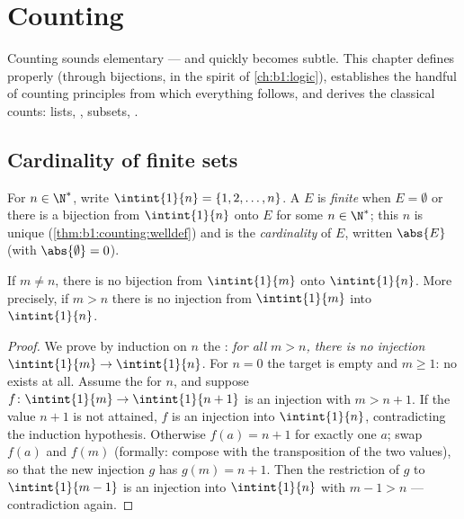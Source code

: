 \chapter{Counting}\label{ch:b1:counting}

Counting  sounds elementary --- and quickly becomes subtle.
This chapter defines  properly (through bijections, in the
spirit of \cref{ch:b1:logic}), establishes the handful of counting
principles from which everything follows, and derives the classical
counts: lists, , subsets, .

\section{Cardinality of finite sets}

\begin{definition}\label{def:b1:counting:card}
For $n \in \N^*$, write $\intint{1}{n} = \{1, 2, \dots,
n\}$. A  $E$ is \emph{finite} when $E = \emptyset$
or there is a bijection from $\intint{1}{n}$ onto $E$ for
some $n \in \N^*$; this $n$ is unique (\cref{thm:b1:counting:welldef})
and is the \emph{cardinality} of $E$, written
$\abs{E}$ (with $\abs{\emptyset} = 0$).
\end{definition}

\begin{theorem}\label{thm:b1:counting:welldef}
If $m \neq n$, there is no bijection from $\intint{1}{m}$
onto $\intint{1}{n}$. More precisely, if $m > n$ there is
no injection from $\intint{1}{m}$ into $\intint{1}{n}$.
\end{theorem}

\begin{proof}
We prove by induction on $n$ the : \emph{for all $m > n$,
there is no injection $\intint{1}{m} \to \intint{1}{n}$}. For $n = 0$ the target is empty and $m \geq 1$: no 
exists at all. Assume the  for $n$, and suppose $f \colon
\intint{1}{m} \to \intint{1}{n+1}$ is an
injection with $m > n + 1$. If the value $n + 1$ is not attained, $f$
is an injection into $\intint{1}{n}$, contradicting the
induction hypothesis. Otherwise $f(a) = n + 1$ for exactly one $a$;
swap $f(a)$ and $f(m)$ (formally: compose with the transposition of
the two values), so that the new injection $g$ has $g(m) = n + 1$.
Then the restriction of $g$ to $\intint{1}{m-1}$ is an
injection into $\intint{1}{n}$ with $m - 1 > n$ ---
contradiction again.
\end{proof}

